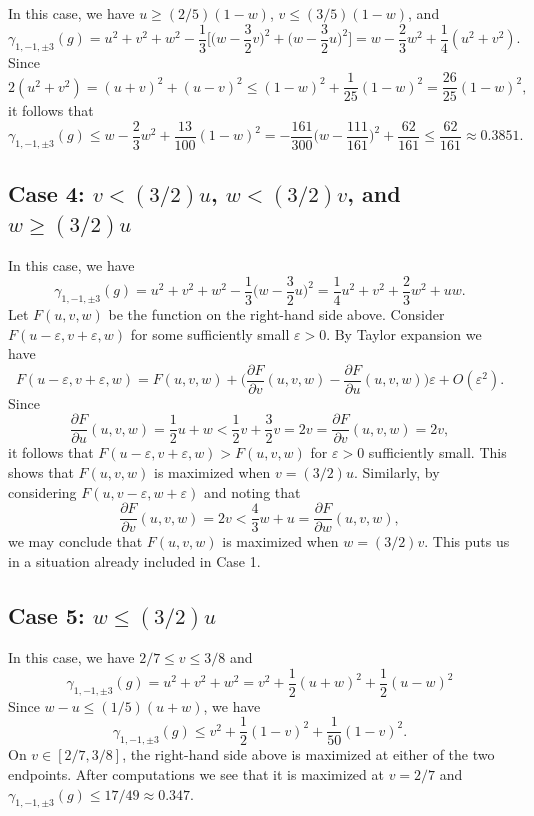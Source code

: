 \documentclass[12pt, notitlepage]{amsart}
\numberwithin{equation}{section}
\newcommand{\eps}{\varepsilon}
\theoremstyle{remark}
\theoremstyle{definition}
\theoremstyle{remark}
\numberwithin{equation}{section}
\begin{document}
In this case, we have $u \geq (2/5)(1-w)$, $v \leq (3/5)(1-w)$, and
$$
\gamma_{1,-1,\pm 3}(g) =  u^2+v^2+w^2 - \frac{1}{3}\Big[\Big(w - \frac{3}{2}v\Big)^2 + \Big(w - \frac{3}{2}u\Big)^2\Big] = w-\frac{2}{3}w^2 + \frac{1}{4}(u^2+v^2).
$$
Since
$$
2(u^2+v^2) = (u+v)^2 + (u-v)^2 \leq (1-w)^2 + \frac{1}{25}(1-w)^2 = \frac{26}{25}(1-w)^2,
$$
it follows that
$$
\gamma_{1,-1,\pm 3}(g) \leq w -\frac{2}{3}w^2 + \frac{13}{100}(1-w)^2 = -\frac{161}{300}\Big(w - \frac{111}{161}\Big)^2 + \frac{62}{161} \leq \frac{62}{161} \approx 0.3851.
$$

\subsection*{Case 4: $v < (3/2)u$, $w <  (3/2)v$, and $w \geq (3/2)u$}

In this case, we have
$$
\gamma_{1,-1,\pm 3}(g) =  u^2+v^2+w^2 - \frac{1}{3}\Big(w - \frac{3}{2}u\Big)^2 = \frac{1}{4}u^2 + v^2 + \frac{2}{3}w^2 + uw.
$$
Let $F(u,v,w)$ be the function on the right-hand side above. Consider $F(u-\eps, v+\eps, w)$ for some sufficiently small $\eps > 0$. By Taylor expansion we have
$$
F(u-\eps, v+\eps, w) = F(u,v,w) + \Big(\frac{\partial F}{\partial v}(u,v,w) - \frac{\partial F}{\partial u}(u,v,w)\Big) \eps + O(\eps^2).
$$
Since
$$
\frac{\partial F}{\partial u}(u,v,w) = \frac{1}{2}u + w < \frac{1}{2}v + \frac{3}{2}v = 2v = \frac{\partial F}{\partial v}(u,v,w) = 2v,
$$
it follows that $F(u-\eps, v+\eps, w) > F(u,v,w)$ for $\eps > 0$ sufficiently small. This shows that $F(u,v,w)$ is maximized  when $v = (3/2)u$. Similarly, by considering $F(u, v-\eps, w+\eps)$ and noting that
$$
 \frac{\partial F}{\partial v}(u,v,w) = 2v < \frac{4}{3}w + u =  \frac{\partial F}{\partial w}(u,v,w),
$$
we may conclude that $F(u,v,w)$ is maximized when $w = (3/2)v$. This puts us in a situation already included in Case 1.

\subsection*{Case 5: $w \leq (3/2)u$}

In this case, we have $2/7 \leq v \leq 3/8$ and
$$
\gamma_{1,-1,\pm 3}(g) =  u^2+v^2+w^2 = v^2 + \frac{1}{2}(u+w)^2 + \frac{1}{2}(u-w)^2
$$
Since $w-u \leq (1/5)(u+w)$, we have
$$
\gamma_{1,-1,\pm 3}(g) \leq  v^2 + \frac{1}{2}(1-v)^2 + \frac{1}{50}(1-v)^2.
$$
On $v \in [2/7, 3/8]$, the right-hand side above is maximized at either of the two endpoints. After computations we see that it is maximized at $v = 2/7$ and $\gamma_{1,-1,\pm 3}(g) \leq 17/49 \approx 0.347$.
\end{document}
